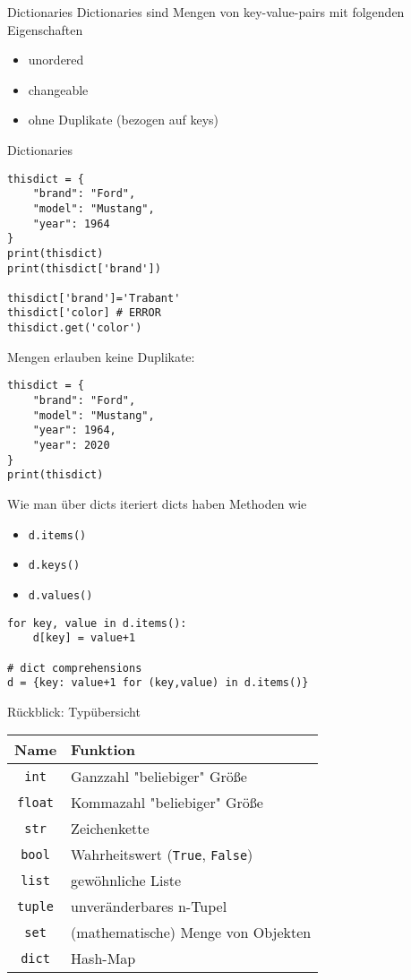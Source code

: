 \begin{frame}[fragile]{Dictionaries}
	Dictionaries sind Mengen von key-value-pairs mit folgenden Eigenschaften
	\begin{itemize}
		\item unordered
		\item changeable
		\item ohne Duplikate (bezogen auf keys)
	\end{itemize}
\end{frame}

\begin{frame}[fragile]{Dictionaries}
\begin{lstlisting}
thisdict = {
    "brand": "Ford",
    "model": "Mustang",
    "year": 1964
}
print(thisdict)
print(thisdict['brand'])

thisdict['brand']='Trabant'
thisdict['color] # ERROR
thisdict.get('color')
\end{lstlisting}
\end{frame}

\begin{frame}[fragile]
Mengen erlauben keine Duplikate:
\begin{lstlisting}
thisdict = {
    "brand": "Ford",
    "model": "Mustang",
    "year": 1964,
    "year": 2020
}
print(thisdict) 

\end{lstlisting}	
\end{frame}

\begin{frame}[fragile]{Wie man über dicts iteriert}
dicts haben Methoden wie
\begin{itemize}
	\item \texttt{d.items()}
	\item \texttt{d.keys()}
	\item \texttt{d.values()}
\end{itemize}
\begin{lstlisting}
for key, value in d.items():
	d[key] = value+1
	
# dict comprehensions
d = {key: value+1 for (key,value) in d.items()}
\end{lstlisting}
\end{frame}

\begin{frame}{Rückblick: Typübersicht}
	\begin{tabular}{c|l}
		Name & Funktion \\ \hline
		\texttt{int} & Ganzzahl "beliebiger" Größe \\
		\texttt{float} & Kommazahl "beliebiger" Größe \\
		\texttt{str} & Zeichenkette \\
		\texttt{bool} & Wahrheitswert (\texttt{True}, \texttt{False})\\ \hline
		\texttt{list} & gewöhnliche Liste \\
		\texttt{tuple} & unveränderbares n-Tupel \\
		\texttt{set} & (mathematische) Menge von Objekten \\
		\texttt{dict} & Hash-Map \\
	\end{tabular}
\end{frame}

